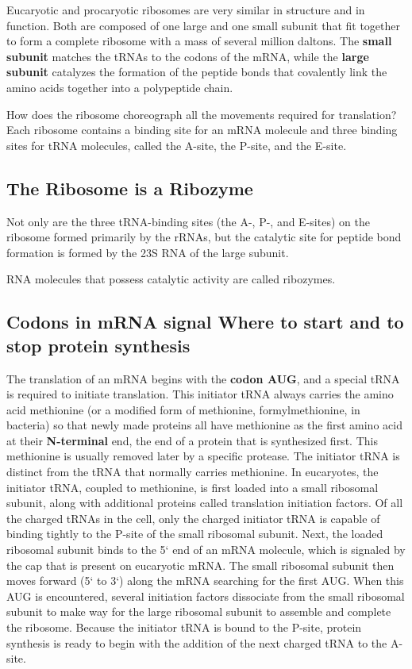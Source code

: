 Eucaryotic and procaryotic ribosomes are very similar in structure and
in function. Both are composed of one large and one small subunit that
fit together to form a complete ribosome with a mass of several million daltons.
The \textbf{small subunit} matches the tRNAs to
the codons of the mRNA, while the \textbf{large subunit} catalyzes the formation
of the peptide bonds that covalently link the amino acids together
into a polypeptide chain.

How does the ribosome choreograph all the movements required for
translation? Each ribosome contains a binding site for an mRNA molecule
and three binding sites for tRNA molecules, called the A-site, the
P-site, and the E-site.

\subsection{The Ribosome is a Ribozyme}

Not only are the three tRNA-binding sites (the A-, P-, and E-sites) on the
ribosome formed primarily by the rRNAs, but the catalytic site for peptide
bond formation is formed by the 23S RNA of the large subunit.

RNA molecules that possess catalytic activity are called ribozymes.

\subsection{Codons in mRNA signal Where to start and to stop protein synthesis}

The translation of an mRNA begins with the \textbf{codon AUG}, and a special
tRNA is required to initiate translation. This initiator tRNA always carries
the amino acid methionine (or a modified form of methionine, formylmethionine,
in bacteria) so that newly made proteins all have methionine
as the first amino acid at their \textbf{N-terminal} end, the end of a protein that
is synthesized first. This methionine is usually removed later by a specific
protease. The initiator tRNA is distinct from the tRNA that normally carries methionine.
In eucaryotes, the initiator tRNA, coupled to methionine, is first loaded into
a small ribosomal subunit, along with additional proteins called translation
initiation factors. Of all the charged tRNAs in the cell,
only the charged initiator tRNA is capable of binding tightly to the P-site
of the small ribosomal subunit. Next, the loaded ribosomal subunit binds
to the 5` end of an mRNA molecule, which is signaled by the cap that is
present on eucaryotic mRNA. The small ribosomal subunit then moves forward
(5` to 3`) along the mRNA searching for the first
AUG. When this AUG is encountered, several initiation factors dissociate
from the small ribosomal subunit to make way for the large ribosomal
subunit to assemble and complete the ribosome. Because the initiator
tRNA is bound to the P-site, protein synthesis is ready to begin with the
addition of the next charged tRNA to the A-site.

